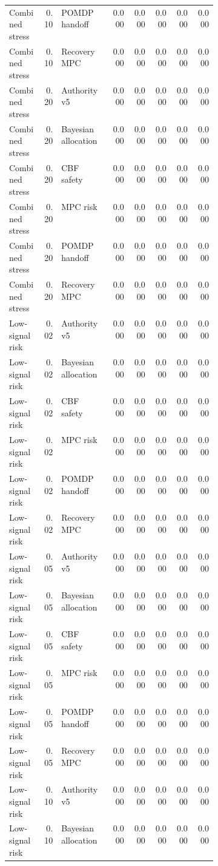 \documentclass{article}
\begin{document}
\begin{center}
\begin{longtable}{p{0.16\linewidth}rp{0.24\linewidth}rrrrr}
Combined stress & 0.10 & POMDP handoff & 0.000 & 0.000 & 0.000 & 0.000 & 0.000\\
Combined stress & 0.10 & Recovery MPC & 0.000 & 0.000 & 0.000 & 0.000 & 0.000\\
Combined stress & 0.20 & Authority v5 & 0.000 & 0.000 & 0.000 & 0.000 & 0.000\\
Combined stress & 0.20 & Bayesian allocation & 0.000 & 0.000 & 0.000 & 0.000 & 0.000\\
Combined stress & 0.20 & CBF safety & 0.000 & 0.000 & 0.000 & 0.000 & 0.000\\
Combined stress & 0.20 & MPC risk & 0.000 & 0.000 & 0.000 & 0.000 & 0.000\\
Combined stress & 0.20 & POMDP handoff & 0.000 & 0.000 & 0.000 & 0.000 & 0.000\\
Combined stress & 0.20 & Recovery MPC & 0.000 & 0.000 & 0.000 & 0.000 & 0.000\\
Low-signal risk & 0.02 & Authority v5 & 0.000 & 0.000 & 0.000 & 0.000 & 0.000\\
Low-signal risk & 0.02 & Bayesian allocation & 0.000 & 0.000 & 0.000 & 0.000 & 0.000\\
Low-signal risk & 0.02 & CBF safety & 0.000 & 0.000 & 0.000 & 0.000 & 0.000\\
Low-signal risk & 0.02 & MPC risk & 0.000 & 0.000 & 0.000 & 0.000 & 0.000\\
Low-signal risk & 0.02 & POMDP handoff & 0.000 & 0.000 & 0.000 & 0.000 & 0.000\\
Low-signal risk & 0.02 & Recovery MPC & 0.000 & 0.000 & 0.000 & 0.000 & 0.000\\
Low-signal risk & 0.05 & Authority v5 & 0.000 & 0.000 & 0.000 & 0.000 & 0.000\\
Low-signal risk & 0.05 & Bayesian allocation & 0.000 & 0.000 & 0.000 & 0.000 & 0.000\\
Low-signal risk & 0.05 & CBF safety & 0.000 & 0.000 & 0.000 & 0.000 & 0.000\\
Low-signal risk & 0.05 & MPC risk & 0.000 & 0.000 & 0.000 & 0.000 & 0.000\\
Low-signal risk & 0.05 & POMDP handoff & 0.000 & 0.000 & 0.000 & 0.000 & 0.000\\
Low-signal risk & 0.05 & Recovery MPC & 0.000 & 0.000 & 0.000 & 0.000 & 0.000\\
Low-signal risk & 0.10 & Authority v5 & 0.000 & 0.000 & 0.000 & 0.000 & 0.000\\
Low-signal risk & 0.10 & Bayesian allocation & 0.000 & 0.000 & 0.000 & 0.000 & 0.000\\

\end{longtable}
\end{center}
\end{document}
